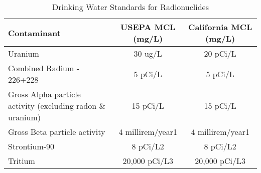 \documentclass{article}
\begin{document}
\begin{table}[ht]
\begin{center}
\begin{tabular}{|l|c|c|}
\hline
Contaminant  & USEPA   MCL  (mg/L) & California   MCL  (mg/L) \\
\hline
Uranium                                                                & 30 ug/L                                                          & 20 pCi/L   \\ \hline
Combined   Radium   -   226+228                                        & 5   pCi/L                                                         & 5   pCi/L                         \\ \hline
Gross   Alpha   particle   activity   (excluding   radon   \& uranium) & 15 pCi/L                                                          & 15 pCi/L                                                       \\ \hline
Gross   Beta   particle   activity                                     & 4 millirem/year1  & 4 millirem/year1                        \\ \hline
Strontium-90                                                           & 8   pCi/L2                                                                                                                                    & 8   pCi/L2                                                       \\ \hline
Tritium                                                                & 20,000   pCi/L3                                                  & 20,000   pCi/L3                                                  \\ \hline
\end{tabular}
\caption{Drinking Water Standards for Radionuclides}
\end{center}
\end{table}
\end{document}
